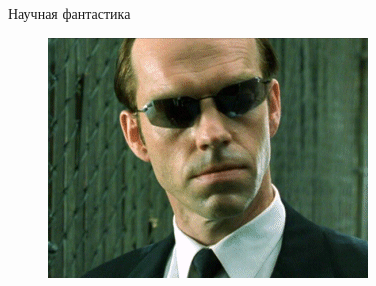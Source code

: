 \documentclass[10pt]{beamer}
\begin{document}
\begin{frame} {Научная фантастика}
\begin{figure}
\begin{minipage}{.33\textwidth}
\begin{minipage}{\textwidth}
			\end{minipage}
			\begin{minipage}{\textwidth}
			  \includegraphics[width=0.9 \linewidth, height=0.9 \textheight, keepaspectratio]{images/smith}
			\end{minipage}
		\end{minipage}%
		\begin{minipage}{.33\textwidth}
		\end{minipage}
	\end{figure}
\end{frame}
\end{document}
